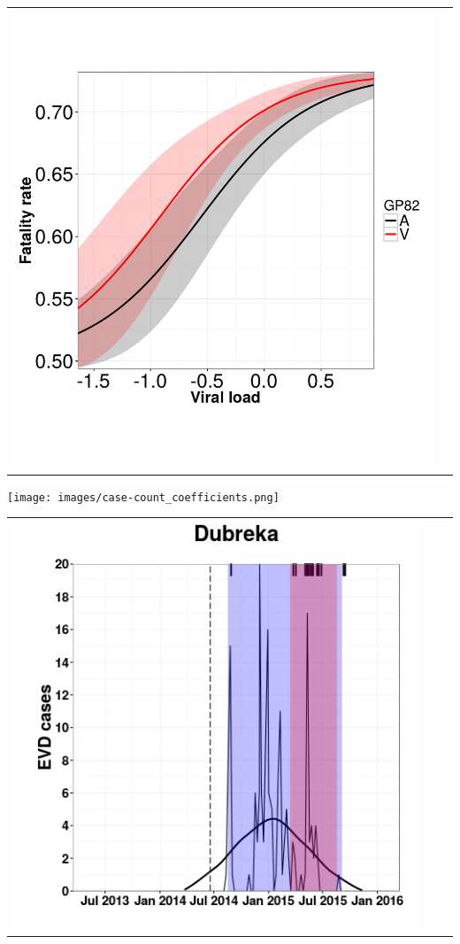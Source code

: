 \documentclass[portrait,final,a0paper,fontscale=0.277]{baposter}
\begin{document}
\begin{poster}
{\begin{tabular}{cc}
 \includegraphics[scale=0.32,valign=c]{images/predicted_fatality_rates.pdf}
\end{tabular}
\texttt{[image: images/case-count\_coefficients.png]}\\
 \begin{tabular}{ccc}
 \includegraphics[scale=0.268]{images/maxCases_Dubreka.png} &

\end{tabular}}
\end{poster}
\end{document}
